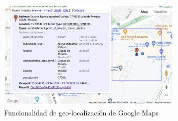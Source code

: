 \begin{figure}[H]
    \centering
    \includegraphics[width=0.8\textwidth]{imagenes/04-diseno/api-geocode-google-maps.png}
    \caption{Funcionalidad de geo-localización de Google Maps}
    \label{fig:google-maps}
\end{figure}


